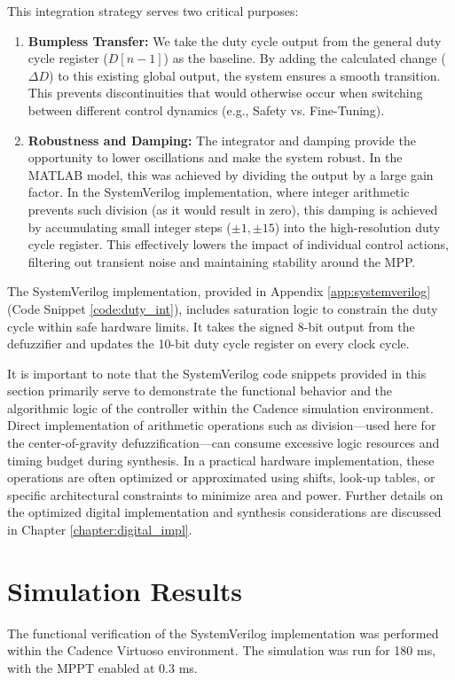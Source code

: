 \documentclass[a4paper,oneside,12pt]{report}
\numberwithin{equation}{chapter}
\begin{document}
This integration strategy serves two critical purposes:
\begin{enumerate}
    \item \textbf{Bumpless Transfer:} We take the duty cycle output from the general duty cycle register ($D[n-1]$) as the baseline. By adding the calculated change ($\Delta D$) to this existing global output, the system ensures a smooth transition. This prevents discontinuities that would otherwise occur when switching between different control dynamics (e.g., Safety vs. Fine-Tuning).
    \item \textbf{Robustness and Damping:} The integrator and damping provide the opportunity to lower oscillations and make the system robust. In the MATLAB model, this was achieved by dividing the output by a large gain factor. In the SystemVerilog implementation, where integer arithmetic prevents such division (as it would result in zero), this damping is achieved by accumulating small integer steps ($\pm 1, \pm 15$) into the high-resolution duty cycle register. This effectively lowers the impact of individual control actions, filtering out transient noise and maintaining stability around the MPP.
\end{enumerate}

The SystemVerilog implementation, provided in Appendix \ref{app:systemverilog} (Code Snippet \ref{code:duty_int}), includes saturation logic to constrain the duty cycle within safe hardware limits. It takes the signed 8-bit output from the defuzzifier and updates the 10-bit duty cycle register on every clock cycle.

It is important to note that the SystemVerilog code snippets provided in this section primarily serve to demonstrate the functional behavior and the algorithmic logic of the controller within the Cadence simulation environment. Direct implementation of arithmetic operations such as division---used here for the center-of-gravity defuzzification---can consume excessive logic resources and timing budget during synthesis. In a practical hardware implementation, these operations are often optimized or approximated using shifts, look-up tables, or specific architectural constraints to minimize area and power. Further details on the optimized digital implementation and synthesis considerations are discussed in Chapter \ref{chapter:digital_impl}.

\section{Simulation Results}
\label{sec:sv_simulation_results}
The functional verification of the SystemVerilog implementation was performed within the Cadence Virtuoso environment. The simulation was run for 180 ms, with the MPPT enabled at 0.3 ms.
\end{document}
